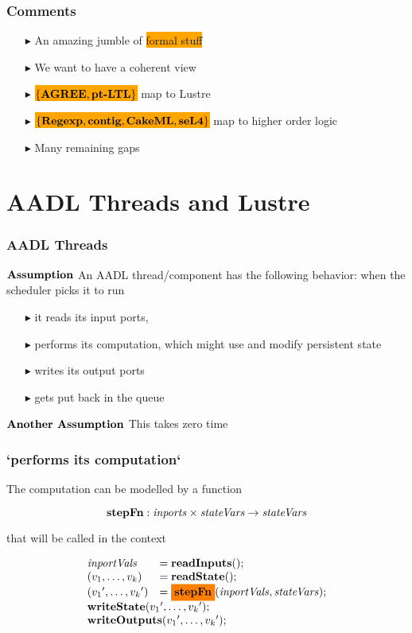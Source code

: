 \documentclass{beamer}
\newcommand{\kemph}[1]{\colorbox{orange}{#1}}
\newcommand{\konst}[1]{\ensuremath{\mbox{\bf{#1}}}}
\newcommand{\set}[1]{\{ {#1} \}}
\begin{document}
\begin{frame}\frametitle{Comments}
\begin{itemize}
\item [$\blacktriangleright$] An amazing jumble of \kemph{formal stuff}
\item [$\blacktriangleright$] We want to have a coherent view
\item [$\blacktriangleright$]
\kemph{$\set{\konst{AGREE},\konst{pt-LTL}}$} map to Lustre
\item [$\blacktriangleright$]
  \kemph{$\set{\konst{Regexp},\konst{contig},\konst{CakeML}, \konst{seL4}}$} map to higher order logic
\item [$\blacktriangleright$] Many remaining gaps
\end{itemize}
\end{frame}


\section {AADL Threads and Lustre}

\begin{frame}\frametitle{AADL Threads}

\konst{Assumption} An AADL thread/component has the following
behavior: when the scheduler picks it to run

\begin{itemize}
\item [$\blacktriangleright$] it reads its input ports,
\item [$\blacktriangleright$] performs its computation, which might use and modify persistent state
\item [$\blacktriangleright$] writes its output ports
\item [$\blacktriangleright$] gets put back in the queue

\end{itemize}

\konst{Another Assumption} This takes zero time
\end{frame}

\begin{frame}\frametitle{`performs its computation`}

The computation can be modelled by a function

\[
\konst{stepFn} : \mathit{inports} \times \mathit{stateVars} \to \mathit{stateVars}
\]

that will be called in the context

\[
\begin{array}{ll}
 \mathit{inportVals} & = \konst{readInputs}(); \\
 (v_1,\ldots,v_k) & = \konst{readState}() ; \\
 ({v_1}',\ldots,{v_k}') & = \kemph{\konst{stepFn}} (\mathit{inportVals},\mathit{stateVars}) ; \\
 \multicolumn{2}{l}{\konst{writeState}({v_1}',\ldots,{v_k}');} \\
 \multicolumn{2}{l}{\konst{writeOutputs}({v_1}',\ldots,{v_k}');} \\
\end{array}
\]

\end{frame}
\end{document}
